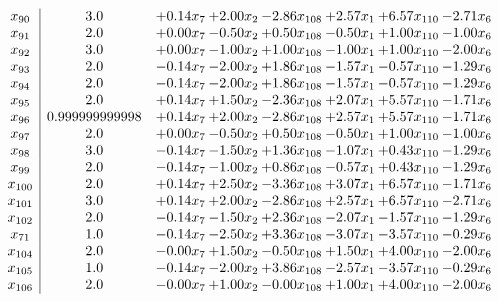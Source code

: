 \documentclass[8pt]{article}
\begin{document}
\[\begin{array}{c| c c@{\hskip 2pt} c@{\hskip 2pt} c@{\hskip 2pt} c@{\hskip 2pt} c@{\hskip 2pt} c@{\hskip 2pt} }
 x_{90}   &  3.0 & +  0.14 x_{7} & +  2.00 x_{2} & -2.86 x_{108} & +  2.57 x_{1} & +  6.57 x_{110} & -2.71 x_{6}\\
 x_{91}   &  2.0 & +  0.00 x_{7} & -0.50 x_{2} & +  0.50 x_{108} & -0.50 x_{1} & +  1.00 x_{110} & -1.00 x_{6}\\
 x_{92}   &  3.0 & +  0.00 x_{7} & -1.00 x_{2} & +  1.00 x_{108} & -1.00 x_{1} & +  1.00 x_{110} & -2.00 x_{6}\\
 x_{93}   &  2.0 & -0.14 x_{7} & -2.00 x_{2} & +  1.86 x_{108} & -1.57 x_{1} & -0.57 x_{110} & -1.29 x_{6}\\
 x_{94}   &  2.0 & -0.14 x_{7} & -2.00 x_{2} & +  1.86 x_{108} & -1.57 x_{1} & -0.57 x_{110} & -1.29 x_{6}\\
 x_{95}   &  2.0 & +  0.14 x_{7} & +  1.50 x_{2} & -2.36 x_{108} & +  2.07 x_{1} & +  5.57 x_{110} & -1.71 x_{6}\\
 x_{96}   &  0.999999999998 & +  0.14 x_{7} & +  2.00 x_{2} & -2.86 x_{108} & +  2.57 x_{1} & +  5.57 x_{110} & -1.71 x_{6}\\
 x_{97}   &  2.0 & +  0.00 x_{7} & -0.50 x_{2} & +  0.50 x_{108} & -0.50 x_{1} & +  1.00 x_{110} & -1.00 x_{6}\\
 x_{98}   &  3.0 & -0.14 x_{7} & -1.50 x_{2} & +  1.36 x_{108} & -1.07 x_{1} & +  0.43 x_{110} & -1.29 x_{6}\\
 x_{99}   &  2.0 & -0.14 x_{7} & -1.00 x_{2} & +  0.86 x_{108} & -0.57 x_{1} & +  0.43 x_{110} & -1.29 x_{6}\\
 x_{100}   &  2.0 & +  0.14 x_{7} & +  2.50 x_{2} & -3.36 x_{108} & +  3.07 x_{1} & +  6.57 x_{110} & -1.71 x_{6}\\
 x_{101}   &  3.0 & +  0.14 x_{7} & +  2.00 x_{2} & -2.86 x_{108} & +  2.57 x_{1} & +  6.57 x_{110} & -2.71 x_{6}\\
 x_{102}   &  2.0 & -0.14 x_{7} & -1.50 x_{2} & +  2.36 x_{108} & -2.07 x_{1} & -1.57 x_{110} & -1.29 x_{6}\\
 x_{71}   &  1.0 & -0.14 x_{7} & -2.50 x_{2} & +  3.36 x_{108} & -3.07 x_{1} & -3.57 x_{110} & -0.29 x_{6}\\
 x_{104}   &  2.0 & -0.00 x_{7} & +  1.50 x_{2} & -0.50 x_{108} & +  1.50 x_{1} & +  4.00 x_{110} & -2.00 x_{6}\\
 x_{105}   &  1.0 & -0.14 x_{7} & -2.00 x_{2} & +  3.86 x_{108} & -2.57 x_{1} & -3.57 x_{110} & -0.29 x_{6}\\
 x_{106}   &  2.0 & -0.00 x_{7} & +  1.00 x_{2} & -0.00 x_{108} & +  1.00 x_{1} & +  4.00 x_{110} & -2.00 x_{6}\\

\end{array}\]
\end{document}

